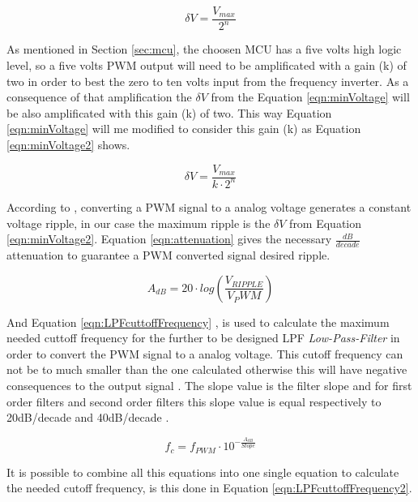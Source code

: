 			\begin{equation}\label{eqn:minVoltage}
				\delta V=\frac{V_{max}}{2^{n}}
			\end{equation}
	
		As mentioned in Section \ref{sec:mcu}, the choosen MCU has a five volts high logic level, so a five volts PWM output will need to be amplificated with a gain (k) of two in order to best the zero to ten volts input from the frequency inverter. As a consequence of that amplification the $\delta V$ from the Equation \ref{eqn:minVoltage} will be also amplificated with this gain (k) of two. This way Equation \ref{eqn:minVoltage} will me modified to consider this gain (k) as Equation \ref{eqn:minVoltage2} shows.

			\begin{equation}\label{eqn:minVoltage2}
				\delta V=\frac{V_{max}}{k \cdot 2^{n}}
			\end{equation}

		According to \cite{alter2008pwm}, converting a PWM signal to a analog voltage generates a constant voltage ripple, in our case the maximum ripple is the $\delta V$ from Equation \ref{eqn:minVoltage2}. Equation \ref{eqn:attenuation} \cite{metivier2013pwm} gives the necessary $\frac{dB}{decade}$ attenuation to guarantee a PWM converted signal desired ripple.

	 		\begin{equation}\label{eqn:attenuation}
				A_{dB}=20\cdot log \left( \frac{V_{RIPPLE}}{V_PWM} \right) 
			\end{equation}
	
		And Equation \ref{eqn:LPFcuttoffFrequency} \cite{metivier2013pwm}, is used to calculate the maximum needed cuttoff frequency for the further to be designed LPF \textit{Low-Pass-Filter} in order to convert the PWM signal to a analog voltage. This cutoff frequency can not be to much smaller than the one calculated otherwise this will have negative consequences to the output signal \cite{keim2016pwm}. The slope value is the filter slope and for first order filters and second order filters this slope value is equal respectively to 20dB/decade and 40dB/decade \cite{metivier2013pwm}.
	
			\begin{equation}\label{eqn:LPFcuttoffFrequency}
				f_{c}=f_{PWM} \cdot 10^{-\frac{A_{dB}}{Slope}}
			\end{equation}

		It is possible to combine all this equations into one single equation to calculate the needed cutoff frequency, is this done in Equation \ref{eqn:LPFcuttoffFrequency2}.

